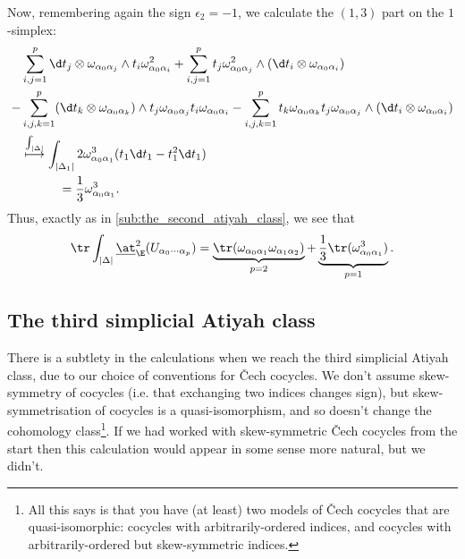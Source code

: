         Now, remembering again the sign \mbox{$\epsilon_2=-1$}, we calculate the $(1,3)$ part on the $1$-simplex:
        \begin{align*}
            &\sum_{i,j=1}^p \d t_j\otimes\omega_{\alpha_0\alpha_j}\wedge t_i\omega_{\alpha_0\alpha_i}^2 + \sum_{i,j=1}^pt_j\omega_{\alpha_0\alpha_j}^2\wedge(\d t_i\otimes\omega_{\alpha_0\alpha_i})\\
            - &\sum_{i,j,k=1}^p (\d t_k\otimes\omega_{\alpha_0\alpha_k})\wedge t_j\omega_{\alpha_0\alpha_j} t_i\omega_{\alpha_0\alpha_i} - \sum_{i,j,k=1}^p t_k\omega_{\alpha_0\alpha_k} t_j\omega_{\alpha_0\alpha_j}\wedge(\d t_i\otimes\omega_{\alpha_0\alpha_i})\\
            &\overset{\int_{|\Delta|}}{\longmapsto} \int_{|\Delta_1|} 2\omega_{\alpha_0\alpha_1}^3 (t_1\d t_1 - t_1^2\d t_1)\\
            &\qquad\quad= \frac13\omega_{\alpha_0\alpha_1}^3.
        \end{align*}
    Thus, exactly as in \cref{sub:the_second_atiyah_class}, we see that
        \begin{equation}
            \tr\int_{|\Delta|}\underline{\at}_\E^2(U_{\alpha_0\cdots\alpha_p}) = \underbrace{\tr(\omega_{\alpha_0\alpha_1}\omega_{\alpha_1\alpha_2})}_{p=2} + \underbrace{\frac13\tr(\omega_{\alpha_0\alpha_1}^3)}_{p=1}.
        \end{equation}


    \subsection{The third simplicial Atiyah class} %
    \label{sub:the_third_simplicial_atiyah_class}

        There is a subtlety in the calculations when we reach the third simplicial Atiyah class, due to our choice of conventions for Čech cocycles.
        We don't assume skew-symmetry of cocycles (i.e. that exchanging two indices changes sign), but skew-symmetrisation of cocycles is a quasi-isomorphism, and so doesn't change the cohomology class\footnote{All this says is that you have (at least) two models of Čech cocycles that are quasi-isomorphic: cocycles with arbitrarily-ordered indices, and cocycles with arbitrarily-ordered but skew-symmetric indices.}.
        If we had worked with skew-symmetric Čech cocycles from the start then this calculation would appear in some sense more natural, but we didn't.

